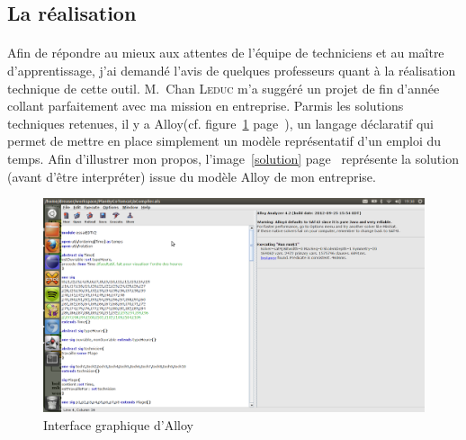 \subsection{La réalisation}%
\paragraph{}

Afin de répondre au mieux aux attentes de l'équipe de techniciens et au maître d'apprentissage, j'ai demandé l'avis de quelques professeurs quant à la réalisation technique de cette outil. M.~Chan \textsc{Leduc} m'a suggéré un projet de fin d'année collant parfaitement avec ma mission en entreprise. Parmis les solutions techniques retenues, il y a Alloy(cf. figure~\ref{GUIalloy} page~\pageref{GUIalloy}), un langage déclaratif qui permet de mettre en place simplement un modèle représentatif d'un emploi du temps. 
Afin d'illustrer mon propos, l'image~\ref{solution} page~\pageref{solution} représente la solution (avant d'être interpréter) issue du modèle Alloy de mon entreprise.
\begin{center}
  \begin{figure}[ht]
    \caption{\label{GUIalloy} Interface graphique d'Alloy}
    \includegraphics [width=1\textwidth]{images/alloy/GUIalloy.png}
  \end{figure}
\end{center}
